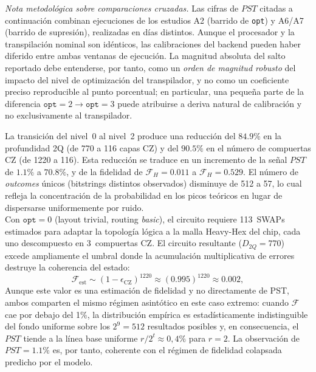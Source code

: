 \documentclass[12pt, spanish]{book}
\begin{document}
\textit{Nota metodológica sobre comparaciones cruzadas.} Las cifras de $PST$ citadas a continuación combinan ejecuciones de los estudios A2 (barrido de \texttt{opt}) y A6/A7 (barrido de supresión), realizadas en días distintos. Aunque el procesador y la transpilación nominal son idénticos, las calibraciones del backend pueden haber diferido entre ambas ventanas de ejecución. La magnitud absoluta del salto reportado debe entenderse, por tanto, como un \emph{orden de magnitud robusto} del impacto del nivel de optimización del transpilador, y no como un coeficiente preciso reproducible al punto porcentual; en particular, una pequeña parte de la diferencia $\texttt{opt}=2 \to \texttt{opt}=3$ puede atribuirse a deriva natural de calibración y no exclusivamente al transpilador.

La transición del nivel~0 al nivel~2 produce una reducción del $84.9\%$ en la profundidad 2Q (de 770 a 116 capas CZ) y del $90.5\%$ en el número de compuertas CZ (de 1220 a 116). Esta reducción se traduce en un incremento de la señal $PST$ de $1.1\%$ a $70.8\%$, y de la fidelidad de $\mathcal{F}_H = 0.011$ a $\mathcal{F}_H = 0.529$. El número de \textit{outcomes} únicos (bitstrings distintos observados) disminuye de 512 a 57, lo cual refleja la concentración de la probabilidad en los picos teóricos en lugar de dispersarse uniformemente por ruido.\\

Con $\texttt{opt} = 0$ (layout trivial, routing \textit{basic}), el circuito requiere 113~SWAPs estimados para adaptar la topología lógica a la malla Heavy-Hex del chip, cada uno descompuesto en 3~compuertas CZ. El circuito resultante ($D_{2Q} = 770$) excede ampliamente el umbral donde la acumulación multiplicativa de errores destruye la coherencia del estado:
\begin{equation}
    \mathcal{F}_{\text{est}} \sim (1 - \epsilon_{\text{CZ}})^{1220} \approx (0.995)^{1220} \approx 0.002,
    \label{eq:fidelidad_opt0}
\end{equation}
Aunque este valor es una estimación de fidelidad y no directamente de PST, ambos comparten el mismo régimen asintótico en este caso extremo: cuando $\mathcal{F}$ cae por debajo del 1\%, la distribución empírica es estadísticamente indistinguible del fondo uniforme sobre los $2^9 = 512$ resultados posibles y, en consecuencia, el $PST$ tiende a la línea base uniforme $r/2^t \approx 0{,}4\%$ para $r = 2$. La observación de $PST = 1.1\%$ es, por tanto, coherente con el régimen de fidelidad colapsada predicho por el modelo.
\end{document}

